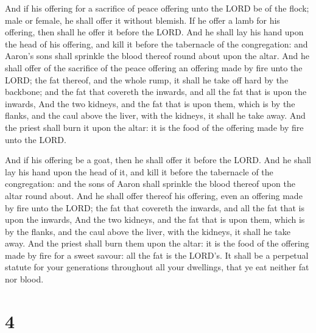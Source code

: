  And if his offering for a sacrifice of peace offering unto
the LORD be of the flock; male or female, he shall offer it without
blemish.  If he offer a lamb for his offering, then shall he
offer it before the LORD.  And he shall lay his hand upon
the head of his offering, and kill it before the tabernacle of the
congregation: and Aaron's sons shall sprinkle the blood thereof round
about upon the altar.  And he shall offer of the sacrifice
of the peace offering an offering made by fire unto the LORD; the fat
thereof, and the whole rump, it shall he take off hard by the backbone;
and the fat that covereth the inwards, and all the fat that is upon the
inwards,  And the two kidneys, and the fat that is upon
them, which is by the flanks, and the caul above the liver, with the
kidneys, it shall he take away.  And the priest shall burn
it upon the altar: it is the food of the offering made by fire unto the
LORD.

 And if his offering be a goat, then he shall offer it
before the LORD.  And he shall lay his hand upon the head
of it, and kill it before the tabernacle of the congregation: and the
sons of Aaron shall sprinkle the blood thereof upon the altar round
about.  And he shall offer thereof his offering, even an
offering made by fire unto the LORD; the fat that covereth the inwards,
and all the fat that is upon the inwards,  And the two
kidneys, and the fat that is upon them, which is by the flanks, and the
caul above the liver, with the kidneys, it shall he take away.
 And the priest shall burn them upon the altar: it is the
food of the offering made by fire for a sweet savour: all the fat is the
LORD's.  It shall be a perpetual statute for your
generations throughout all your dwellings, that ye eat neither fat nor
blood.

\hypertarget{section-3}{%
\section{4}\label{section-3}}

